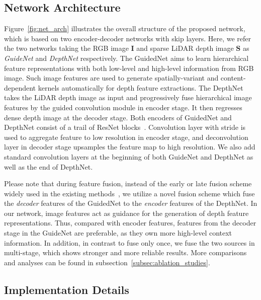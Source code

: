 \documentclass[journal]{IEEEtran}
\begin{document}
\subsection{Network Architecture}
\label{subsec:net_arch}
Figure~\ref{fig:net_arch} illustrates the overall structure of the proposed network, which is based on two encoder-decoder networks with skip layers.
Here, we refer the two networks taking the RGB image $\mathbf{I}$ and sparse LiDAR depth image $\mathbf{S}$ as \emph{GuideNet} and \emph{DepthNet} respectively.
The GuidedNet aims to learn hierarchical feature representations with both low-level and high-level information from RGB image.
Such image features are used to generate spatially-variant and content-dependent kernels automatically for depth feature extractions.
The DepthNet takes the LiDAR depth image as input and progressively fuse hierarchical image features by the guided convolution module in encoder stage.
It then regresses dense depth image at the decoder stage.
Both encoders of GuidedNet and DepthNet consist of a trail of ResNet blocks~\cite{res_net}.
Convolution layer with stride is used to aggregate feature to low resolution in encoder stage,
and deconvolution layer in decoder stage upsamples the feature map to high resolution.
We also add standard convolution layers at the beginning of both GuideNet and DepthNet as well as the end of DepthNet.  

Please note that during feature fusion, instead of the early or late fusion scheme widely used in the existing methods~\cite{deep_lidar, sparse_noisy, self_supervised},
we utilize a novel fusion scheme which fuse the \emph{decoder} features of the GuidedNet to the \emph{encoder} features of the DepthNet.
In our network, image features act as guidance for the generation of depth feature representations.
Thus, compared with encoder features, features from the decoder stage in the GuideNet are preferable, as they own more high-level context information.
In addition, in contrast to fuse only once,
we fuse the two sources in multi-stage, which shows stronger and more reliable results.
More comparisons and analyses can be found in subsection~\ref{subsec:ablation_studies}.


\subsection{Implementation Details}
\label{subsec:implement_detail}
\end{document}

